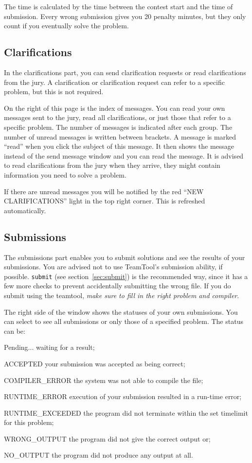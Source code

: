 \documentclass[a4paper]{artikel3}
\newcommand{\cmd}[1]{\texttt{#1}}
\newenvironment{ddlist}[1]%
  {\begin{list}{}{\settowidth{\labelwidth}{\textbf{#1}}
   \setlength{\leftmargin}{\labelwidth}
   \addtolength{\leftmargin}{\labelsep}
   \renewcommand{\makelabel}[1]{\textbf{\hfill##1}}}}%
  {\end{list}}
\begin{document}
The time is calculated by the time between the contest start and the time of
submission. Every wrong submission gives you 20 penalty minutes, but they
only count if you eventually solve the problem.

\subsection{Clarifications}

In the clarifications part, you can send clarification requests or read
clarifications from the jury. A clarification or clarification request can
refer to a specific problem, but this is not required.

On the right of this page is the index of messages. You can read your own
messages sent to the jury, read all clarifications, or just those that refer
to a specific problem. The number of messages is indicated after each group.
The number of unread messages is written between brackets. A message is
marked ``read'' when you click the subject of this message. It then shows
the message instead of the send message window and you can read the message.
It is advised to read clarifications from the jury when they arrive, they
might contain information you need to solve a problem.

If there are unread messages you will be notified by the red ``NEW
CLARIFICATIONS'' light in the top right corner. This is refreshed automatically.

\subsection{Submissions}

The submissions part enables you to submit solutions and see the results of
your submissions. You are advised not to use TeamTool's submission ability,
if possible. \cmd{submit} (see section~\ref{sec:submit}) is the recommended
way, since it has a few more checks to prevent accidentally submitting the
wrong file. If you do submit using the teamtool, \emph{make sure to fill in
the right problem and compiler}.

The right side of the window shows the statuses of your own submissions. You
can select to see all submissions or only those of a specified problem. The
status can be:

\begin{ddlist}{XRUNTIMEXEXCEEDED}
\item[Pending...] waiting for a result;
\item[ACCEPTED] your submission was accepted as being correct;
\item[COMPILER\_ERROR] the system was not able to compile the file;
\item[RUNTIME\_ERROR] execution of your submission resulted in a run-time
error;
\item[RUNTIME\_EXCEEDED] the program did not terminate within the set
timelimit for this problem;
\item[WRONG\_OUTPUT] the program did not give the correct output or;
\item[NO\_OUTPUT] the program did not produce any output at all.
\end{ddlist}
\end{document}
